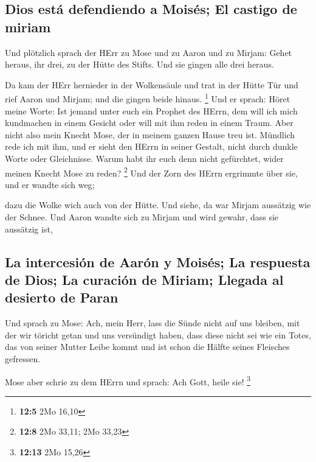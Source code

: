 \hypertarget{dios-estuxe1-defendiendo-a-moisuxe9s-el-castigo-de-miriam}{%
\subsection{Dios está defendiendo a Moisés; El castigo de
miriam}\label{dios-estuxe1-defendiendo-a-moisuxe9s-el-castigo-de-miriam}}

 Und plötzlich sprach der HErr zu Mose und zu Aaron und zu
Mirjam: Gehet heraus, ihr drei, zu der Hütte des Stifts. Und sie gingen
alle drei heraus.

 Da kam der HErr hernieder in der Wolkensäule und trat in
der Hütte Tür und rief Aaron und Mirjam; und die gingen beide hinaus.
\footnote{\textbf{12:5} 2Mo 16,10}  Und er sprach: Höret
meine Worte: Ist jemand unter euch ein Prophet des HErrn, dem will ich
mich kundmachen in einem Gesicht oder will mit ihm reden in einem Traum.
 Aber nicht also mein Knecht Mose, der in meinem ganzen
Hause treu ist.  Mündlich rede ich mit ihm, und er sieht
den HErrn in seiner Gestalt, nicht durch dunkle Worte oder Gleichnisse.
Warum habt ihr euch denn nicht gefürchtet, wider meinen Knecht Mose zu
reden? \footnote{\textbf{12:8} 2Mo 33,11; 2Mo 33,23}  Und
der Zorn des HErrn ergrimmte über sie, und er wandte sich weg;

 dazu die Wolke wich auch von der Hütte. Und siehe, da
war Mirjam aussätzig wie der Schnee. Und Aaron wandte sich zu Mirjam und
wird gewahr, dass sie aussätzig ist,

\hypertarget{la-intercesiuxf3n-de-aaruxf3n-y-moisuxe9s-la-respuesta-de-dios-la-curaciuxf3n-de-miriam-llegada-al-desierto-de-paran}{%
\subsection{La intercesión de Aarón y Moisés; La respuesta de Dios; La
curación de Miriam; Llegada al desierto de
Paran}\label{la-intercesiuxf3n-de-aaruxf3n-y-moisuxe9s-la-respuesta-de-dios-la-curaciuxf3n-de-miriam-llegada-al-desierto-de-paran}}

 Und sprach zu Mose: Ach, mein Herr, lass die Sünde nicht
auf uns bleiben, mit der wir töricht getan und uns versündigt haben,
 dass diese nicht sei wie ein Totes, das von seiner
Mutter Leibe kommt und ist schon die Hälfte seines Fleisches gefressen.

 Mose aber schrie zu dem HErrn und sprach: Ach Gott,
heile sie! \footnote{\textbf{12:13} 2Mo 15,26}

